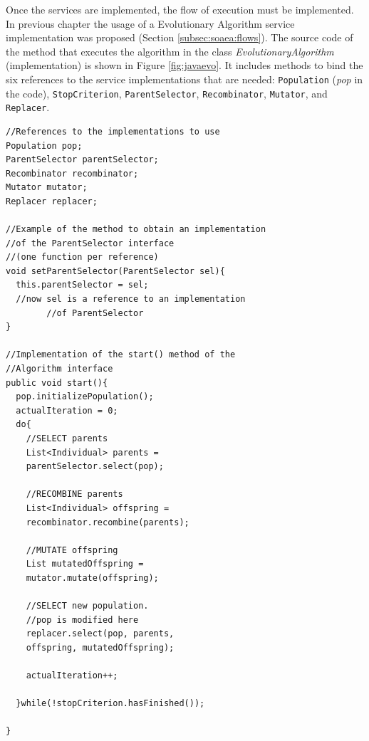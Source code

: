 Once the services are implemented, the flow of execution must be implemented. In previous chapter the usage of a Evolutionary Algorithm service implementation was proposed (Section \ref{subsec:soaea:flows}). The source code of the method that executes the algorithm in the class
{\em EvolutionaryAlgorithm} (implementation) is shown in Figure
\ref{fig:javaevo}. It includes methods to bind the six references
to the service implementations that are needed: \texttt{Population} ({\em pop}
in the code), \texttt{StopCriterion}, \texttt{ParentSelector}, \texttt{Recombinator}, \texttt{Mutator},
and \texttt{Replacer}.  %


\newsavebox{\mintedbox} %
\begin{lrbox}{\mintedbox}
\begin{minipage}{10cm}
\begin{verbatim}
//References to the implementations to use
Population pop;
ParentSelector parentSelector;
Recombinator recombinator;
Mutator mutator;
Replacer replacer;

//Example of the method to obtain an implementation
//of the ParentSelector interface 
//(one function per reference)
void setParentSelector(ParentSelector sel){
  this.parentSelector = sel;
  //now sel is a reference to an implementation 
        //of ParentSelector
}

//Implementation of the start() method of the 
//Algorithm interface
public void start(){
  pop.initializePopulation();
  actualIteration = 0;
  do{
    //SELECT parents
    List<Individual> parents = 
    parentSelector.select(pop);
      
    //RECOMBINE parents
    List<Individual> offspring = 
    recombinator.recombine(parents);
      
    //MUTATE offspring
    List mutatedOffspring = 
    mutator.mutate(offspring);
      
    //SELECT new population. 
    //pop is modified here
    replacer.select(pop, parents, 
    offspring, mutatedOffspring);
      
    actualIteration++;
      
  }while(!stopCriterion.hasFinished());
    
}
\end{verbatim}
\end{minipage}
\end{lrbox}

